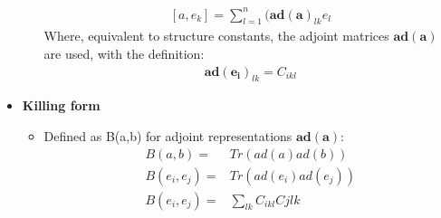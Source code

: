 \begin{itemize}
\begin{itemize}
\begin{equation}
\begin{split}
        [a,e_k]=\sum_{l=1}^n (\pmb{ad(a)}_{lk}e_l
        \end{split}\end{equation}
        Where, equivalent to structure constants, the adjoint matrices $\pmb{ad(a)}$ are used, with the definition:
        \begin{equation}\begin{split}
        \pmb{ad(e_i)}_{lk}=C_{ikl}
        \end{split}\end{equation}
    \end{itemize}
    \item \textbf{Killing form} \cite{pfeifer}
    \begin{itemize}
        \item Defined as B(a,b) for adjoint representations $\pmb{ad(a)}$: \cite{pfeifer}
        \begin{equation}\begin{split}
        B(a,b)=&Tr(ad(a) ad(b)) \\
        B(e_i,e_j)=&Tr(ad(e_i) ad(e_j)) \\
        B(e_i,e_j)=& \sum_{lk}C_{ikl}C{jlk} \\
        \end{split}\end{equation}
    \end{itemize}
\end{itemize}


